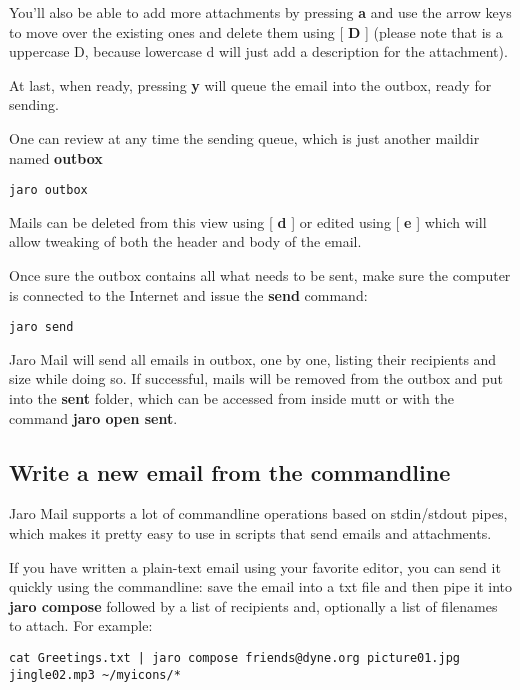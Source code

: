 \documentclass[a4,onecolumn,portrait]{article}
\begin{document}
You'll also be able to add more attachments by pressing \textbf{a} and use the arrow keys to move over the existing ones and delete them using [ \textbf{D} ] (please note that is a uppercase D, because lowercase d will just add a description for the attachment).


At last, when ready, pressing \textbf{y} will queue the email into the outbox, ready for sending.

One can review at any time the sending queue, which is just another maildir named \textbf{outbox}

\begin{verbatim}
jaro outbox
\end{verbatim}

Mails can be deleted from this view using [ \textbf{d} ] or edited using [ \textbf{e} ] which will allow tweaking of both the header and body of the email.

Once sure the outbox contains all what needs to be sent, make sure the computer is connected to the Internet and issue the \textbf{send} command:

\begin{verbatim}
jaro send
\end{verbatim}

Jaro Mail will send all emails in outbox, one by one, listing their recipients and size while doing so. If successful, mails will be removed from the outbox and put into the \textbf{sent} folder, which can be accessed from inside mutt or with the command \textbf{jaro open sent}.
\subsection{Write a new email from the commandline}
\label{sec-6-3}

Jaro Mail supports a lot of commandline operations based on stdin/stdout pipes, which makes it pretty easy to use in scripts that send emails and attachments.

If you have written a plain-text email using your favorite editor, you can send it quickly using the commandline: save the email into a txt file and then pipe it into \textbf{jaro compose} followed by a list of recipients and, optionally a list of filenames to attach. For example:

\begin{verbatim}
cat Greetings.txt | jaro compose friends@dyne.org picture01.jpg jingle02.mp3 ~/myicons/*
\end{verbatim}
\end{document}
